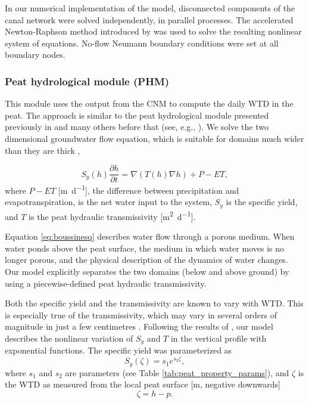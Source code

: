 \documentclass[bg, manuscript]{copernicus}
\begin{document}
In our numerical implementation of the model, disconnected components of the canal network were solved independently, in parallel processes.
The accelerated Newton-Raphson method introduced by \cite{liuApplyingMicroprocessorAnalysis2014} was used to solve the resulting nonlinear system of equations.
No-flow Neumann boundary conditions were set at all boundary nodes.

\subsubsection{Peat hydrological module (PHM)}
This module uses the output from the CNM to compute the daily WTD in the peat.
The approach is  similar  to the peat hydrological module presented previously in \cite{urzainkiCanalBlockingOptimization2020} and many others before that (see, e.g., \cite{cobbHowTemporalPatterns2017, morrisDigiBogPeatlandDevelopment2012, putraModellingPerformanceBunds2022}).
We solve the two dimensional groundwater flow equation, which is suitable for domains much wider than they are thick \citep{connortonDoesRegionalGroundwaterflow1985, bearModelingGroundwaterFlow2010},

\begin{equation} \label{eq:boussinesq}
S_y(h)\frac{\partial h}{\partial t} = \nabla\left(T(h) \nabla h \right) + P - ET,
\end{equation}
where $P - ET$ [\unit{m d^{-1}}], the difference between precipitation and evapotranspiration, is the net water input to the system, $S_y$ is the specific yield, and $T$ is the peat hydraulic transmissivity [\unit{m^2d^{-1}}].

Equation \eqref{eq:boussinesq} describes water flow through a porous medium.
When water ponds above the peat surface, the medium in which water moves is no longer porous, and the physical description of the dynamics of water changes.
Our model explicitly separates the two domains (below and above ground) by using a piecewise-defined peat hydraulic transmissivity.

Both the specific yield and the transmissivity are known to vary with WTD.
This is especially true of the transmissivity, which may vary in several orders of magnitude in just a few centimetres \citep{cobbHowTemporalPatterns2017}.
Following the results of \cite{cobbScalarSimulationParameterization2019}, our model describes the nonlinear variation of $S_y$ and  $T$ in the vertical profile with exponential functions.
The specific yield was parameterized as
\begin{equation} \label{eq:S_zeta}
S_y (\zeta) = s_1 e^{s_2\zeta},
\end{equation}
where $s_1$ and $s_2$ are parameters (see Table \ref{tab:peat_property_params}), and $\zeta$ is the WTD as measured from the local peat surface [\unit{m}, negative downwards]
\begin{equation} \label{eq:def_zeta}
\zeta = h - p.
\end{equation}
\end{document}
